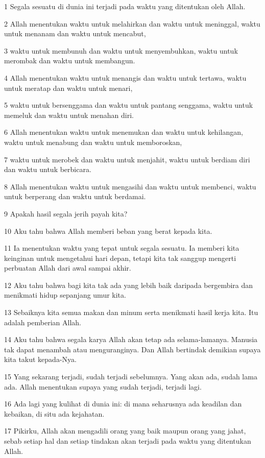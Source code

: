 \par 1 Segala sesuatu di dunia ini terjadi pada waktu yang ditentukan oleh Allah.
\par 2 Allah menentukan waktu untuk melahirkan dan waktu untuk meninggal, waktu untuk menanam dan waktu untuk mencabut,
\par 3 waktu untuk membunuh dan waktu untuk menyembuhkan, waktu untuk merombak dan waktu untuk membangun.
\par 4 Allah menentukan waktu untuk menangis dan waktu untuk tertawa, waktu untuk meratap dan waktu untuk menari,
\par 5 waktu untuk bersenggama dan waktu untuk pantang senggama, waktu untuk memeluk dan waktu untuk menahan diri.
\par 6 Allah menentukan waktu untuk menemukan dan waktu untuk kehilangan, waktu untuk menabung dan waktu untuk memboroskan,
\par 7 waktu untuk merobek dan waktu untuk menjahit, waktu untuk berdiam diri dan waktu untuk berbicara.
\par 8 Allah menentukan waktu untuk mengasihi dan waktu untuk membenci, waktu untuk berperang dan waktu untuk berdamai.
\par 9 Apakah hasil segala jerih payah kita?
\par 10 Aku tahu bahwa Allah memberi beban yang berat kepada kita.
\par 11 Ia menentukan waktu yang tepat untuk segala sesuatu. Ia memberi kita keinginan untuk mengetahui hari depan, tetapi kita tak sanggup mengerti perbuatan Allah dari awal sampai akhir.
\par 12 Aku tahu bahwa bagi kita tak ada yang lebih baik daripada bergembira dan menikmati hidup sepanjang umur kita.
\par 13 Sebaiknya kita semua makan dan minum serta menikmati hasil kerja kita. Itu adalah pemberian Allah.
\par 14 Aku tahu bahwa segala karya Allah akan tetap ada selama-lamanya. Manusia tak dapat menambah atau menguranginya. Dan Allah bertindak demikian supaya kita takut kepada-Nya.
\par 15 Yang sekarang terjadi, sudah terjadi sebelumnya. Yang akan ada, sudah lama ada. Allah menentukan supaya yang sudah terjadi, terjadi lagi.
\par 16 Ada lagi yang kulihat di dunia ini: di mana seharusnya ada keadilan dan kebaikan, di situ ada kejahatan.
\par 17 Pikirku, Allah akan mengadili orang yang baik maupun orang yang jahat, sebab setiap hal dan setiap tindakan akan terjadi pada waktu yang ditentukan Allah.
